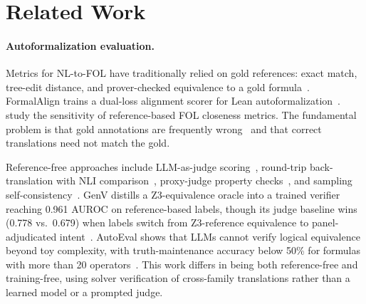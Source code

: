 \documentclass[11pt,letterpaper]{article}
\begin{document}
\section{Related Work}
\label{sec:related}

\paragraph{Autoformalization evaluation.}
Metrics for NL-to-FOL have traditionally relied on gold references: exact match, tree-edit distance, and prover-checked equivalence to a gold formula~\citep{Yang2023, Vossel2025}. FormalAlign trains a dual-loss alignment scorer for Lean autoformalization~\citep{Lu2024}. \citet{Thatikonda2025} study the sensitivity of reference-based FOL closeness metrics. The fundamental problem is that gold annotations are frequently wrong~\citep{Brunello2026, Han2026} and that correct translations need not match the gold.

Reference-free approaches include LLM-as-judge scoring~\citep{Zhang2026a, Dai2026}, round-trip back-translation with NLI comparison~\citep{Amrollahi2026, Shi2022}, proxy-judge property checks~\citep{Xu2026}, and sampling self-consistency~\citep{Wang2022, Kuhn2023}. GenV distills a Z3-equivalence oracle into a trained verifier reaching 0.961 AUROC on reference-based labels, though its judge baseline wins (0.778 vs.\ 0.679) when labels switch from Z3-reference equivalence to panel-adjudicated intent~\citep{Singh2026}. AutoEval shows that LLMs cannot verify logical equivalence beyond toy complexity, with truth-maintenance accuracy below 50\% for formulas with more than 20 operators~\citep{Karia2024}. This work differs in being both reference-free and training-free, using solver verification of cross-family translations rather than a learned model or a prompted judge.
\end{document}
